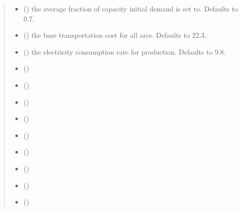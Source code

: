 \documentclass[letterpaper,10pt,english]{sphinxmanual}
\begin{document}
\begin{fulllineitems}
\begin{quote}
\begin{description}
\begin{itemize}
\item {} 
\sphinxAtStartPar
{} (\sphinxstyleliteralemphasis{\sphinxupquote{, }}) \textendash{} the average fraction of capacity initial demand is set to. Defaults to 0.7.

\item {} 
\sphinxAtStartPar
{} (\sphinxstyleliteralemphasis{\sphinxupquote{, }}) \textendash{} the base transportation cost for all arcs. Defaults to 22.3.

\item {} 
\sphinxAtStartPar
{} (\sphinxstyleliteralemphasis{\sphinxupquote{, }}) \textendash{} the electricity consumption rate for production. Defaults to 9.8.

\end{itemize}

\sphinxAtStartPar
\begin{itemize}
\item {} 
\sphinxAtStartPar
{} ()

\item {} 
\sphinxAtStartPar
{} ()

\item {} 
\sphinxAtStartPar
{} ()

\item {} 
\sphinxAtStartPar
{} ()

\item {} 
\sphinxAtStartPar
{} ()

\item {} 
\sphinxAtStartPar
{} ()

\item {} 
\sphinxAtStartPar
{} ()

\item {} 
\sphinxAtStartPar
{} ()

\item {} 
\sphinxAtStartPar
{} ()

\end{itemize}


\end{description}\end{quote}

\end{fulllineitems}
\end{document}
